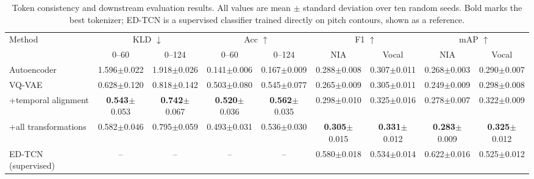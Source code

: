\begin{table}[t]
\centering
\small
\setlength{\tabcolsep}{3pt}
\renewcommand{\arraystretch}{1.12}
\begin{tabular}{lcccc|cccc}
\toprule
\multirow{2}{*}{Method}
& \multicolumn{2}{c}{KLD $\downarrow$}
& \multicolumn{2}{c}{Acc $\uparrow$}
& \multicolumn{2}{c}{F1 $\uparrow$}
& \multicolumn{2}{c}{mAP $\uparrow$} \\
\cmidrule(lr){2-3}\cmidrule(lr){4-5}\cmidrule(lr){6-7}\cmidrule(lr){8-9}
& \scriptsize 0--60 & \scriptsize 0--124
& \scriptsize 0--60 & \scriptsize 0--124
& \scriptsize NIA & \scriptsize Vocal
& \scriptsize NIA & \scriptsize Vocal \\
\midrule
Autoencoder
& 1.596{\scriptsize$\pm$0.022} & 1.918{\scriptsize$\pm$0.026}
& 0.141{\scriptsize$\pm$0.006} & 0.167{\scriptsize$\pm$0.009}
& 0.288{\scriptsize$\pm$0.008} & 0.307{\scriptsize$\pm$0.011}
& 0.268{\scriptsize$\pm$0.003} & 0.290{\scriptsize$\pm$0.007} \\
VQ-VAE
& 0.628{\scriptsize$\pm$0.120} & 0.818{\scriptsize$\pm$0.142}
& 0.503{\scriptsize$\pm$0.080} & 0.545{\scriptsize$\pm$0.077}
& 0.265{\scriptsize$\pm$0.009} & 0.305{\scriptsize$\pm$0.011}
& 0.249{\scriptsize$\pm$0.009} & 0.298{\scriptsize$\pm$0.008} \\
\quad +temporal alignment
& \textbf{0.543}{\scriptsize$\pm$0.053} & \textbf{0.742}{\scriptsize$\pm$0.067}
& \textbf{0.520}{\scriptsize$\pm$0.036} & \textbf{0.562}{\scriptsize$\pm$0.035}
& 0.298{\scriptsize$\pm$0.010} & 0.325{\scriptsize$\pm$0.016}
& 0.278{\scriptsize$\pm$0.007} & 0.322{\scriptsize$\pm$0.009} \\
\quad +all transformations
& 0.582{\scriptsize$\pm$0.046} & 0.795{\scriptsize$\pm$0.059}
& 0.493{\scriptsize$\pm$0.031} & 0.536{\scriptsize$\pm$0.030}
& \textbf{0.305}{\scriptsize$\pm$0.015} & \textbf{0.331}{\scriptsize$\pm$0.012}
& \textbf{0.283}{\scriptsize$\pm$0.009} & \textbf{0.325}{\scriptsize$\pm$0.012} \\
\midrule
ED-TCN (supervised)
& -- & --
& -- & --
& 0.580{\scriptsize$\pm$0.018} & 0.534{\scriptsize$\pm$0.014}
& 0.622{\scriptsize$\pm$0.016} & 0.525{\scriptsize$\pm$0.012} \\
\bottomrule
\end{tabular}
\caption{Token consistency and downstream evaluation results. All values are mean $\pm$ standard deviation over ten random seeds. Bold marks the best tokenizer; ED-TCN is a supervised classifier trained directly on pitch contours, shown as a reference.}
\label{tab:token_consistency}
\end{table}
